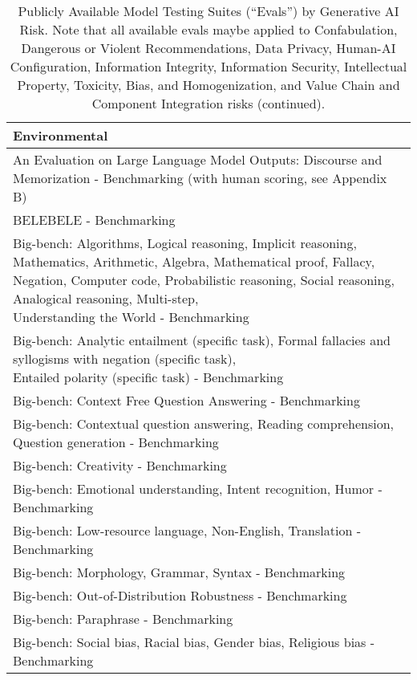 \documentclass[fleqn]{article}
\begin{document}
\begin{table}[H]
	\caption*{Publicly Available Model Testing Suites (``Evals'') by Generative AI Risk. Note that all available evals maybe applied to Confabulation, Dangerous or Violent Recommendations, Data Privacy, Human-AI Configuration, Information Integrity, Information Security, Intellectual Property, Toxicity, Bias, and Homogenization, and Value Chain and Component Integration risks (continued).}
	\label{tab:low_risk_measure_by_gai_risk_cont2}
	\footnotesize
	\begin{tabular}{l}
		\toprule
		Environmental \\
		\midrule
		An Evaluation on Large Language Model Outputs: Discourse and Memorization - Benchmarking (with human scoring, see Appendix B) \\
		BELEBELE - Benchmarking \\
		\makecell[l]{Big-bench: Algorithms, Logical reasoning, Implicit reasoning, Mathematics, Arithmetic, Algebra, Mathematical proof, Fallacy,\\\hspace{10pt} Negation, Computer code, Probabilistic reasoning, Social reasoning, Analogical reasoning, Multi-step,\\\hspace{10pt} Understanding the World - Benchmarking} \\
		\makecell[l]{Big-bench: Analytic entailment (specific task), Formal fallacies and syllogisms with negation (specific task),\\\hspace{10pt}Entailed polarity (specific task) - Benchmarking} \\
		Big-bench: Context Free Question Answering - Benchmarking \\
		Big-bench: Contextual question answering, Reading comprehension, Question generation - Benchmarking \\
		Big-bench: Creativity - Benchmarking \\
		Big-bench: Emotional understanding, Intent recognition, Humor - Benchmarking \\
		Big-bench: Low-resource language, Non-English, Translation - Benchmarking \\
		Big-bench: Morphology, Grammar, Syntax - Benchmarking \\
		Big-bench: Out-of-Distribution Robustness - Benchmarking \\
		Big-bench: Paraphrase - Benchmarking \\
		Big-bench: Social bias, Racial bias, Gender bias, Religious bias - Benchmarking \\

\end{tabular}
\end{table}
\end{document}
